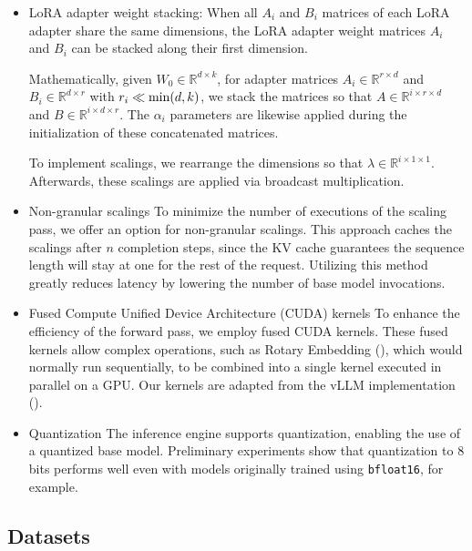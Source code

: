 \begin{itemize}
    \item LoRA adapter weight stacking: When all $A_i$ and $B_i$ matrices of each LoRA adapter share the same dimensions, the LoRA adapter weight matrices $A_i$ and $B_i$ can be stacked along their first dimension.

Mathematically, given $W_0 \in \mathbb{R}^{d \times k}$, for adapter matrices $A_i \in \mathbb{R}^{r \times d}$ and $B_i \in \mathbb{R}^{d \times r}$ with $r_i \ll {\rm min} (d,k)$, we stack the matrices so that $A\in \mathbb{R}^{i \times r \times d}$ and $B\in \mathbb{R}^{i \times d \times r}$. The $\alpha_i$ parameters are likewise applied during the initialization of these concatenated matrices.

To implement scalings, we rearrange the dimensions so that $\lambda \in \mathbb{R} ^ {i \times 1 \times 1}$. Afterwards, these scalings are applied via broadcast multiplication.

\item Non-granular scalings To minimize the number of executions of the scaling pass, we offer an option for non-granular scalings. This approach caches the scalings after $n$ completion steps, since the KV cache guarantees the sequence length will stay at one for the rest of the request. Utilizing this method greatly reduces latency by lowering the number of base model invocations.

\item Fused Compute Unified Device Architecture (CUDA) kernels To enhance the efficiency of the forward pass, we employ fused CUDA kernels. These fused kernels allow complex operations, such as Rotary Embedding (\cite{su2021roformer}), which would normally run sequentially, to be combined into a single kernel executed in parallel on a GPU. Our kernels are adapted from the vLLM implementation (\cite{kwon2023efficient}).

\item Quantization The inference engine supports quantization, enabling the use of a quantized base model. Preliminary experiments show that quantization to 8 bits performs well even with models originally trained using \texttt{bfloat16}, for example.

\end{itemize}

\subsection{Datasets}

